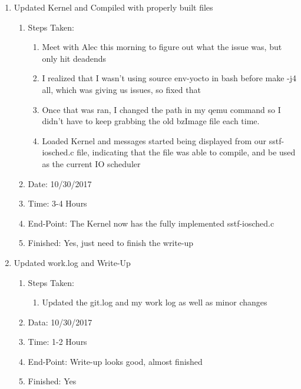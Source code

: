 \documentclass[journal,10pt,onecolumn,compsoc]{IEEEtran} \usepackage[margin=1.0in]{geometry} \usepackage{pdfpages}
\begin{document}
\begin {enumerate}
    \item Updated Kernel and Compiled with properly built files
            \begin{enumerate}
              	\item Steps Taken:
                	\begin {enumerate}
                    	\item Meet with Alec this morning to figure out what the issue was, but only hit deadends
                        \item I realized that I wasn't using source env-yocto in bash before make -j4 all, which was giving us issues, so fixed that
                        \item Once that was ran, I changed the path in my qemu command so I didn't have to keep grabbing the old bzImage file each time.
                        \item Loaded Kernel and messages started being displayed from our sstf-iosched.c file, indicating that the file was able to compile, and be used as the current IO scheduler
                    \end {enumerate}
				\item Date: 10/30/2017
            	\item Time: 3-4 Hours
            	\item End-Point: The Kernel now has the fully implemented sstf-iosched.c
            	\item Finished: Yes, just need to finish the write-up \\
			\end{enumerate}

	\item Updated work.log and Write-Up
    	\begin{enumerate}
        	\item Steps Taken:
            	\begin {enumerate}
                	\item Updated the git.log and my work log as well as minor changes
				\end {enumerate}
            \item Data: 10/30/2017
            \item Time: 1-2 Hours
            \item End-Point: Write-up looks good, almost finished
            \item Finished: Yes
		\end{enumerate}
 \end {enumerate}
 
\end{document}
